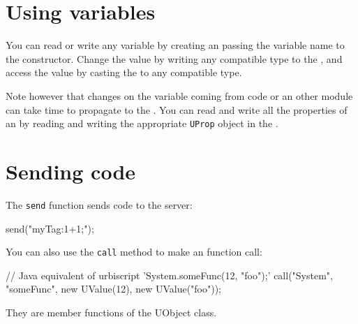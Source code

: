 \section{Using \urbi variables}
\label{sec:uob:apijava:uvar}

You can read or write any \urbi variable by creating an \UVar passing the
variable name to the constructor. Change the value by writing any compatible
type to the \UVar, and access the value by casting the \UVar to any
compatible type.

Note however that changes on the variable coming from \urbi code or an other
module can take time to propagate to the \UVar.  You can read and write all
the \urbi properties of an \UVar by reading and writing the appropriate
\lstinline{UProp} object in the \UVar.

\section{Sending \urbi code}
\label{sec:uob:apijava:sendcode}

The \lstinline{send} function sends \urbi code to the server:

\begin{java}
send("myTag:1+1;");
\end{java}

\noindent
{}%
You can also use the \lstinline{call} method to make an \us function call:

\begin{java}
// Java equivalent of urbiscript 'System.someFunc(12, "foo");'
call("System", "someFunc", new UValue(12), new UValue("foo"));
\end{java}

They are member functions of the UObject class.


